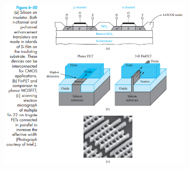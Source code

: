\documentclass[8pt]{article}
\newcommand{\hl}{\noindent\makebox[\linewidth]{\rule{\textwidth}{0.2pt}}}
\begin{document}
\begin{center}
		\includegraphics[width=0.7\textwidth]{fig6-50} \\ \hl \\~\\
	\end{center}
\end{document}
